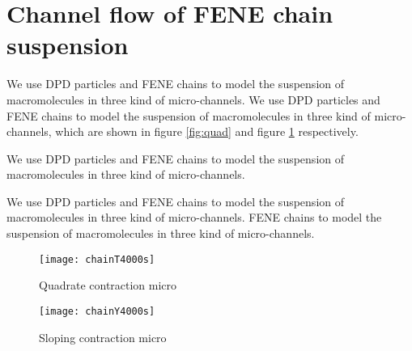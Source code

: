 \section{Channel flow of FENE chain suspension}\label{channel flow}
We use DPD particles and FENE chains to model the suspension of macromolecules in three kind of micro-channels. We use DPD particles and FENE chains to model the suspension of macromolecules in three kind of micro-channels, which are shown in figure \ref{fig:quad} and figure \ref{fig:slop} respectively.

We use DPD particles and FENE chains to model the suspension of macromolecules in three kind of micro-channels. \par
We use DPD particles and FENE chains to model the suspension of macromolecules in three kind of micro-channels. FENE chains to model the suspension of macromolecules in three kind of micro-channels. 

\begin{figure}[htb]
\begin{minipage}[t]{0.48\textwidth}
\centering
\texttt{[image: chainT4000s]}
\caption{Quadrate contraction micro}\label{fig:quad}
\end{minipage}
\begin{minipage}[t]{0.48\textwidth}
\centering
\texttt{[image: chainY4000s]}
\caption{Sloping contraction micro}\label{fig:slop}
\end{minipage}
\end{figure}
